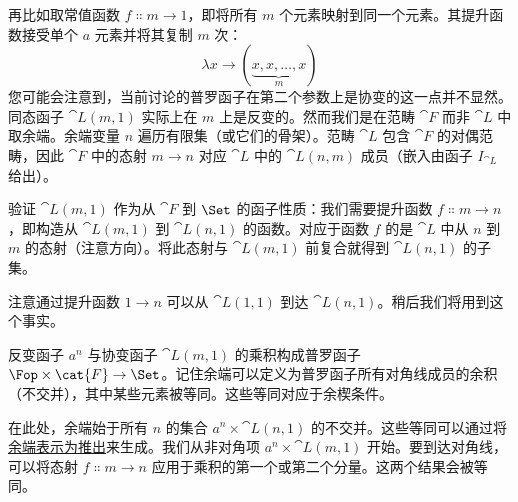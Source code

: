 再比如取常值函数 $f \Colon m \to 1$，即将所有 $m$ 个元素映射到同一个元素。其提升函数接受单个 $a$ 元素并将其复制 $m$ 次：
$$\lambda{}x \to (\underbrace{x, x, \ldots{}, x}_{m})$$
您可能会注意到，当前讨论的普罗函子在第二个参数上是协变的这一点并不显然。同态函子 $\cat{L}(m, 1)$ 实际上在 $m$ 上是反变的。然而我们是在范畴 $\cat{F}$ 而非 $\cat{L}$ 中取余端。余端变量 $n$ 遍历有限集（或它们的骨架）。范畴 $\cat{L}$ 包含 $\cat{F}$ 的对偶范畴，因此 $\cat{F}$ 中的态射 $m \to n$ 对应 $\cat{L}$ 中的 $\cat{L}(n, m)$ 成员（嵌入由函子 $I_{\cat{L}}$ 给出）。

验证 $\cat{L}(m, 1)$ 作为从 $\cat{F}$ 到 $\Set$ 的函子性质：我们需要提升函数 $f \Colon m \to n$，即构造从 $\cat{L}(m, 1)$ 到 $\cat{L}(n, 1)$ 的函数。对应于函数 $f$ 的是 $\cat{L}$ 中从 $n$ 到 $m$ 的态射（注意方向）。将此态射与 $\cat{L}(m, 1)$ 前复合就得到 $\cat{L}(n, 1)$ 的子集。

\begin{figure}[H]
  \centering
\end{figure}

\noindent
注意通过提升函数 $1 \to n$ 可以从 $\cat{L}(1, 1)$ 到达 $\cat{L}(n, 1)$。稍后我们将用到这个事实。

反变函子 $a^n$ 与协变函子 $\cat{L}(m, 1)$ 的乘积构成普罗函子 $\Fop \times \cat{F} \to \Set$。记住余端可以定义为普罗函子所有对角线成员的余积（不交并），其中某些元素被等同。这些等同对应于余楔条件。

在此处，余端始于所有 $n$ 的集合 $a^n \times \cat{L}(n, 1)$ 的不交并。这些等同可以通过将\hyperref[ends-and-coends]{余端表示为推出}来生成。我们从非对角项 $a^n \times \cat{L}(m, 1)$ 开始。要到达对角线，可以将态射 $f \Colon m \to n$ 应用于乘积的第一个或第二个分量。这两个结果会被等同。

\begin{figure}[H]
  \centering
\end{figure}

